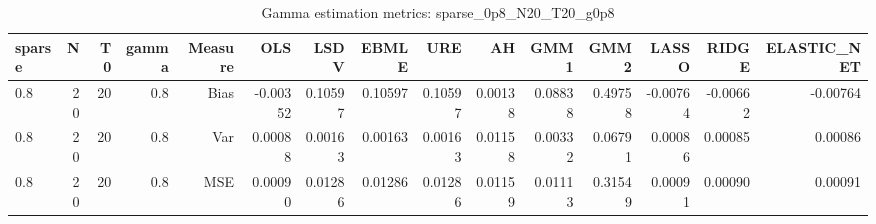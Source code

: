 \begin{table}[!htbp]\centering
\caption{Gamma estimation metrics: sparse_0p8_N20_T20_g0p8}
\label{tab:table1_sparse_0p8_N20_T20_g0p8}
\begin{tabular}{lrrrrrrrrrrrrrr}
\hline
sparse & N & T0 & gamma & Measure & OLS & LSDV & EBMLE & URE & AH & GMM1 & GMM2 & LASSO & RIDGE & ELASTIC_NET \\
\hline
0.8 & 20 & 20 & 0.8 & Bias & -0.00352 & 0.10597 & 0.10597 & 0.10597 & 0.00138 & 0.08838 & 0.49758 & -0.00764 & -0.00662 & -0.00764 \\
0.8 & 20 & 20 & 0.8 & Var & 0.00088 & 0.00163 & 0.00163 & 0.00163 & 0.01158 & 0.00332 & 0.06791 & 0.00086 & 0.00085 & 0.00086 \\
0.8 & 20 & 20 & 0.8 & MSE & 0.00090 & 0.01286 & 0.01286 & 0.01286 & 0.01159 & 0.01113 & 0.31549 & 0.00091 & 0.00090 & 0.00091 \\
\hline
\end{tabular}
\end{table}

